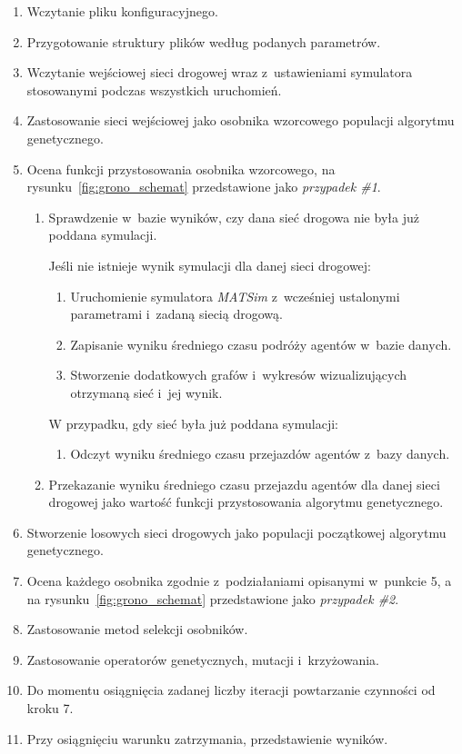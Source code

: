 \documentclass[twoside,12pt]{report}
\begin{document}
\begin{enumerate}
\item Wczytanie pliku konfiguracyjnego.
\item Przygotowanie struktury plików według podanych parametrów.
\item Wczytanie wejściowej sieci drogowej wraz z~ustawieniami symulatora stosowanymi podczas wszystkich uruchomień.
\item Zastosowanie sieci wejściowej jako osobnika wzorcowego populacji algorytmu genetycznego.
\item Ocena funkcji przystosowania osobnika wzorcowego, na rysunku~\ref{fig:grono_schemat} przedstawione jako \textit{przypadek \#1}.
\begin{enumerate}
\item Sprawdzenie w~bazie wyników, czy dana sieć drogowa nie była już poddana symulacji.

Jeśli nie istnieje wynik symulacji dla danej sieci drogowej:
\begin{enumerate}
\item Uruchomienie symulatora \textit{MATSim} z~wcześniej ustalonymi parametrami i~zadaną siecią drogową.
\item Zapisanie wyniku średniego czasu podróży agentów w~bazie danych.
\item Stworzenie dodatkowych grafów i~wykresów wizualizujących otrzymaną sieć i~jej wynik.
\end{enumerate}

W przypadku, gdy sieć była już poddana symulacji:
\begin{enumerate}
\item Odczyt wyniku średniego czasu przejazdów agentów z~bazy danych.
\end{enumerate}
\item Przekazanie wyniku średniego czasu przejazdu agentów dla danej sieci drogowej jako wartość funkcji przystosowania algorytmu genetycznego.
\end{enumerate}

\item Stworzenie losowych sieci drogowych jako populacji początkowej algorytmu genetycznego.
\item Ocena każdego osobnika zgodnie z~podziałaniami opisanymi w~punkcie 5, a na rysunku~\ref{fig:grono_schemat} przedstawione jako \textit{przypadek \#2}.
\item Zastosowanie metod selekcji osobników.
\item Zastosowanie operatorów genetycznych, mutacji i~krzyżowania.
\item Do momentu osiągnięcia zadanej liczby iteracji powtarzanie czynności od kroku 7.
\item Przy osiągnięciu warunku zatrzymania, przedstawienie wyników.
\end{enumerate}
\end{document}
